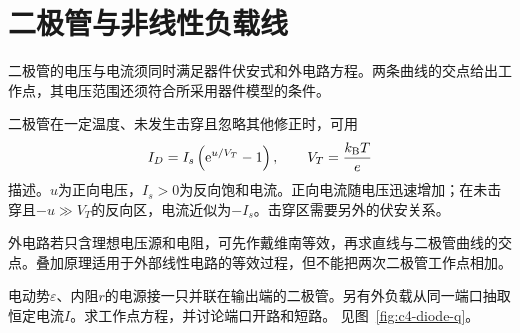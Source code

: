\section{二极管与非线性负载线}\label{sec:c4-diode}
二极管的电压与电流须同时满足器件伏安式和外电路方程。两条曲线的交点给出工作点，其电压范围还须符合所采用器件模型的条件。

二极管在一定温度、未发生击穿且忽略其他修正时，可用
\[
 I_D=I_s\left(\mathrm e^{u/V_T}-1\right),\qquad
 V_T=\frac{k_{\rm B}T}{e}
\]
描述。$u$为正向电压，$I_s>0$为反向饱和电流。正向电流随电压迅速增加；在未击穿且$-u\gg V_T$的反向区，电流近似为$-I_s$。击穿区需要另外的伏安关系。

外电路若只含理想电压源和电阻，可先作戴维南等效，再求直线与二极管曲线的交点。叠加原理适用于外部线性电路的等效过程，但不能把两次二极管工作点相加。

\begin{example}[输出电流改变时的负载线]\label{ex:c4-diode}
电动势$\varepsilon$、内阻$r$的电源接一只并联在输出端的二极管。另有外负载从同一端口抽取恒定电流$I$。求工作点方程，并讨论端口开路和短路。 见图~\ref{fig:c4-diode-q}。
\end{example}

